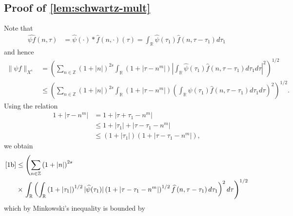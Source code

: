 \documentclass[12pt,reqno]{amsart}
\numberwithin{equation}{section}  %
\numberwithin{figure}{section}
\newcommand{\rr}{\mathbb{R}}
\newcommand{\zz}{\mathbb{Z}}
\newcommand{\wh}{\widehat}
\theoremstyle{plain}
\theoremstyle{definition}
\theoremstyle{remark}
\begin{document}
\begin{appendices}
\subsection{Proof of \cref{lem:schwartz-mult}}
Note that
%
%
\begin{equation*}
	\begin{split}
		\wh{\psi f}\left( n, \tau \right)
		& = \wh{\psi}(\cdot) * \wh{f}(n,
		\cdot)(\tau)
		= \int_\rr \wh{\psi}(\tau_1) \wh{f} \left( n, \tau - \tau_1 \right) 
		d\tau_1
	\end{split}
\end{equation*}
%
%
and hence
%
%
\begin{equation}
	\label{1b}
	\begin{split}
		\|\psi f\|_{X^s} 
		& = \left( \sum_{n \in \zz} \left (1 + |n| \right )^{2s} \int_\rr \left( 1 + | \tau -
		n^{m} | \right) | \int_\rr \wh{\psi}(\tau_1) \wh{f}\left( n, \tau -
		\tau_1
		\right)  d \tau_1 d \tau |^2 \right)^{1/2}
		\\
		& \le \left( \sum_{n \in \zz} \left (1 + |n| \right )^{2s} \int_\rr \left( 1 + | \tau -
		n^{m }
		|
		\right) \left( \int_\rr \wh{\psi}\left( \tau_1 \right) \wh{f}\left( n,
		\tau - \tau_1
		\right)  d \tau_1 d \tau \right)^2 \right)^{1/2}.
	\end{split}
\end{equation}
%
%
Using the relation
%
%
\begin{equation*}
	\begin{split}
		1 + | \tau - n^{m } |
		& = 1 + | \tau + \tau_1 - n^{m} |
		\\
		& \le 1 + | \tau_1 | + | \tau - \tau_1 - n^{m} |
		\\
		& \le \left( 1 + | \tau_1 | \right)\left( 1 + | \tau - \tau_1 -
		n^{m} | \right),
	\end{split}
\end{equation*}
%
%
we obtain
%
%
\begin{equation*}
	\begin{split}
		\eqref{1b}
		& \le \left( \sum_{n \in \zz} \left (1 + |n| \right )^{2s} \right.
		\\
		& \times \left . \int_\rr \left(
		\int_\rr \left( 1 + | \tau_1 | \right)^{1/2} | \wh{\psi}(\tau_1) |
		\left( 1 + | \tau - \tau_1 - n^{m} | \right)^{1/2} \wh{f}\left( n, \tau
		- \tau_1
		\right)d \tau_1
		\right)^2 d \tau \right)^{1/2}
	\end{split}
\end{equation*}
%
%
which by Minkowski's inequality is bounded by
%
%
\begin{equation}

\end{equation}
\end{appendices}
\end{document}
